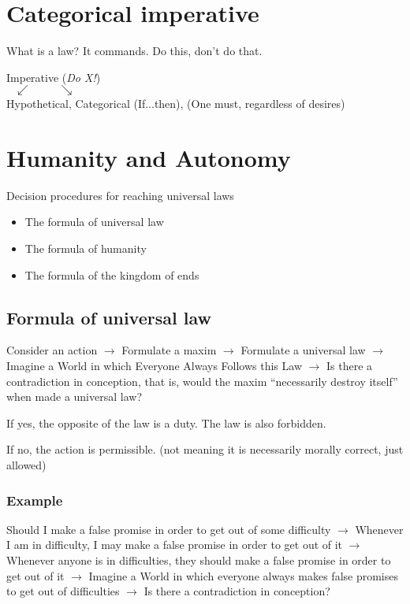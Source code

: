 \documentclass{article}
\begin{document}
\pagebreak
\section{Categorical imperative}
What is a law? It commands. Do this, don't do that.

Imperative (\emph{Do X!})\\
$\hspace*{1em}\swarrow\hspace*{3em}\searrow$\\
Hypothetical, Categorical
(If...then), (One must, regardless of desires)\\

\section{Humanity and Autonomy}
Decision procedures for reaching universal laws
\begin{itemize}
\item The formula of universal law
\item The formula of humanity
\item The formula of the kingdom of ends
\end{itemize}

\subsection{Formula of universal law}
Consider an action $\rightarrow$ Formulate a maxim $\rightarrow$ Formulate a universal law $\rightarrow$ Imagine a World in which Everyone Always Follows this Law $\rightarrow$ Is there a contradiction in conception, that is, would the maxim ``necessarily destroy itself'' when made a universal law?

If yes, the opposite of the law is a duty. The law is also forbidden.

If no, the action is permissible. (not meaning it is necessarily morally correct, just allowed)

\subsubsection{Example}
Should I make a false promise in order to get out of some difficulty $\rightarrow$ Whenever I am in difficulty, I may make a false promise in order to get out of it $\rightarrow$ Whenever anyone is in difficulties, they should make a false promise in order to get out of it $\rightarrow$ Imagine a World in which everyone always makes false promises to get out of difficulties $\rightarrow$ Is there a contradiction in conception?
\end{document}
